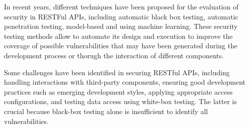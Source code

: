 In recent years, different techniques have been proposed for the evaluation of security in RESTFul APIs, including automatic black box testing\cite{Corradini2023}, automatic penetration testing\cite{Auricchio2022}, model-based\cite{EMEKA2023} and using machine learning\cite{Ghanem2019,Hu2020,Schwartz2019}. These security testing methods allow to automate its design and execution to improve the coverage of possible vulnerabilities that may have been generated during the development process or thorugh the interaction of different components.

Some challenges have been identified in securing RESTful APIs\cite{zhong2023}, including handling interactions with third-party components, ensuring good development practices such as emerging development styles, applying appropriate access configurations, and testing data access using white-box testing. The latter is crucial because black-box testing alone is insufficient to identify all vulnerabilities.
